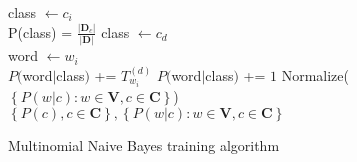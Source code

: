 \begin{algorithm}[h]
 \SetAlgoLined
 
  {
  	class $\leftarrow c_i$\\
  	P(class) = $\frac{\left\vert\mathbf{D}_c\right\vert}{\left\vert\mathbf{D}\right\vert}$
  }
 {
	class $\leftarrow c_d$\\
	{
		word $\leftarrow w_i$ \\
		{
			$P($word$\vert$class$)$ += $T_{w_i}^{(d)}$
		}
		\Else
		{
			$P($word$\vert$class$)$ += $1$
		}
	}
 }
 Normalize($\left\{P(w\vert c) : w \in \mathbf{V}, c \in \mathbf{C}\right\}$)\\
 \Return $\left\{P(c), c \in \mathbf{C}\right\}, \left\{P(w\vert c) : w \in \mathbf{V}, c \in \mathbf{C}\right\}$
 \caption{Multinomial Naive Bayes training algorithm}
 \label{algorithm:naive_bayes_training}
\end{algorithm}
